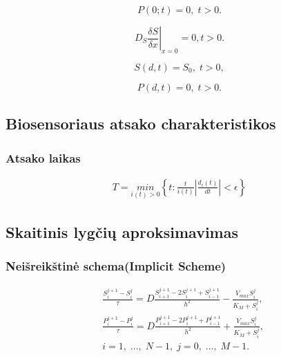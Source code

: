 \documentclass[12pt, a4paper, lithuanian]{article}
\begin{document}
\begin{equation} 
    P(0;t)=0, \; t>0.
\end{equation}

\begin{equation} 
    \left. D_S \frac{\delta S}{\delta x} \right|_{x=0} = 0, t>0.
\end{equation}

\begin{equation} 
    S(d, t) = S_0,\; t>0,
\end{equation}

\begin{equation} 
    P(d, t) = 0,\; t>0.
\end{equation}

\subsection{Biosensoriaus atsako charakteristikos}
\subsubsection{Atsako laikas}
\begin{equation} 
\begin{aligned}
    T = \underset{i(t)>0}{min}\left\{t:\frac{t}{i(t)} \left| \frac{d_i(t)}{dt}
    \right| < \epsilon \right\}
\end{aligned}
\end{equation}

\subsection{Skaitinis lygčių aproksimavimas}
\subsubsection{Neišreikštinė schema(Implicit Scheme)}

\begin{equation}
\begin{aligned} 
    &\frac{S_i^{j+1} - S_i^j}{\tau} = D\frac{S_{i+1}^{j+1} -
    2S_i^{j+1} + S_{i-1}^{j+1}}{h^2} -
    \frac{V_{max} S_i^j}{K_M + S_i^j},\\ 
    &\frac{P_i^{j+1} - P_i^j}{\tau} = D\frac{P_{i+1}^{j+1} -
    2P_i^{j+1} + P_{i-1}^{j+1}}{h^2} +
    \frac{V_{max} S_i^j}{K_M + S_i^j},\\ 
    &i = 1,\;...,\; N-1,\; j=0,\;...,\;M-1.
\end{aligned}
\end{equation}
\end{document}
